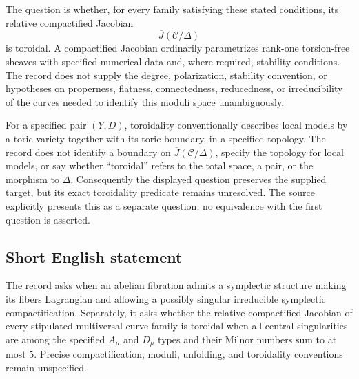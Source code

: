 \documentclass[11pt]{article}
\begin{document}
The question is whether, for every family satisfying these stated conditions, its relative compactified Jacobian
\[
\overline{J}(\mathcal C/\Delta)
\]
is toroidal. A compactified Jacobian ordinarily parametrizes rank-one torsion-free sheaves with specified numerical data and, where required, stability conditions. The record does not supply the degree, polarization, stability convention, or hypotheses on properness, flatness, connectedness, reducedness, or irreducibility of the curves needed to identify this moduli space unambiguously.

For a specified pair \((Y,D)\), toroidality conventionally describes local models by a toric variety together with its toric boundary, in a specified topology. The record does not identify a boundary on \(\overline{J}(\mathcal C/\Delta)\), specify the topology for local models, or say whether ``toroidal'' refers to the total space, a pair, or the morphism to \(\Delta\). Consequently the displayed question preserves the supplied target, but its exact toroidality predicate remains unresolved. The source explicitly presents this as a separate question; no equivalence with the first question is asserted.
\subsection{Short English statement}
The record asks when an abelian fibration admits a symplectic structure making its fibers Lagrangian and allowing a possibly singular irreducible symplectic compactification. Separately, it asks whether the relative compactified Jacobian of every stipulated multiversal curve family is toroidal when all central singularities are among the specified \(A_\mu\) and \(D_\mu\) types and their Milnor numbers sum to at most \(5\). Precise compactification, moduli, unfolding, and toroidality conventions remain unspecified.
\end{document}
